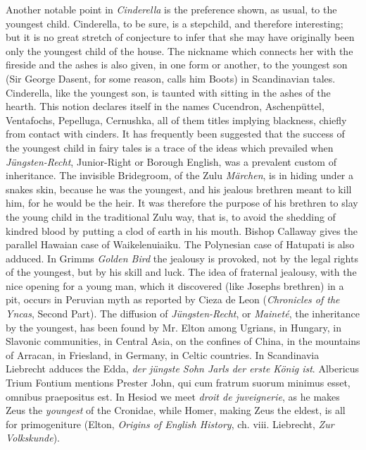 \documentclass[14pt,a4paper]{memoir}
\begin{document}
{Another notable point in \emph{Cinderella} is the preference shown, as
usual, to the youngest child. Cinderella, to be sure, is a stepchild,
and therefore interesting; but it is no great stretch of conjecture to
infer that she may have originally been only the youngest child of the
house. The nickname which connects her with the fireside and the ashes
is also given, in one form or another, to the youngest son (Sir George
Dasent, for some reason, calls him
\textquotesingle Boots\textquotesingle) in Scandinavian tales.
Cinderella, like the youngest son, is taunted with sitting in the ashes
of the hearth. This notion declares itself in the names Cucendron,
Aschenpüttel, Ventafochs, Pepelluga,
Cernushka,
all of them titles implying blackness, chiefly from contact with
cinders. It has frequently been suggested that the success of the
youngest child in fairy tales is a trace of the ideas which prevailed
when \emph{Jüngsten-Recht},
\textquotesingle Junior-Right\textquotesingle{} or Borough English, was
a prevalent custom of
inheritance.
The invisible Bridegroom, of the Zulu \emph{Märchen}, is in hiding under
a snake\textquotesingle s skin, because he was the youngest, and his
jealous brethren meant to kill him, for he would be the heir. It was
therefore the purpose of his brethren to slay the young child in the
traditional Zulu way, that is, to avoid the shedding of
\textquotesingle kindred blood\textquotesingle{} by putting a clod of
earth in his mouth. Bishop Callaway gives the parallel Hawaian case of
Waikelenuiaiku. The Polynesian case of Hatupati is also adduced. In
Grimm\textquotesingle s \emph{Golden Bird} the jealousy is provoked, not
by the legal rights of the youngest, but by his skill and luck. The idea
of fraternal jealousy, with the \textquotesingle nice opening for a
young man,\textquotesingle{} which it discovered (like
Joseph\textquotesingle s brethren) in a pit, occurs in Peruvian myth as
reported by Cieza de Leon (\emph{Chronicles of the Yncas}, Second Part).
The diffusion of \emph{Jüngsten-Recht}, or \emph{Maineté}, the
inheritance by the youngest, has been found by Mr. Elton among Ugrians,
in Hungary, in Slavonic communities, in Central Asia, on the confines of
China, in the mountains of Arracan, in Friesland, in Germany, in Celtic
countries. In Scandinavia Liebrecht adduces the Edda,
\textquotesingle{}\emph{der jüngste Sohn Jarl\textquotesingle s der
erste König ist}.\textquotesingle{} Albericus Trium Fontium mentions
Prester John, \textquotesingle qui cum fratrum suorum minimus esset,
omnibus praepositus est.\textquotesingle{} In Hesiod we meet \emph{droit
de juveignerie}, as he makes Zeus the \emph{youngest} of the Cronidae,
while Homer, making Zeus the eldest, is all for primogeniture (Elton,
\emph{Origins of English History}, ch. viii. Liebrecht, \emph{Zur
Volkskunde}).

}
\end{document}
